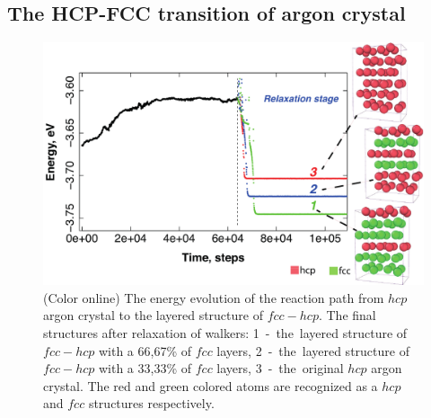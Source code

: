 \documentclass[preprint,12pt]{elsarticle}
\newcounter{bla}
\begin{document}












\subsection{The HCP-FCC transition of argon crystal}

\begin{figure}[!t]
 \begin{center}
 \includegraphics[scale=0.7]{energy.pdf}
  \caption{(Color online) The energy evolution of the reaction path from $hcp$ argon crystal to the layered structure of $fcc-hcp$.
  The final structures after relaxation of walkers:  1~-~the~layered structure of $fcc-hcp$ with a 66,67\% of $fcc$ layers, 2~-~the~layered structure of $fcc-hcp$ with a 33,33\% of $fcc$ layers, 3~-~the~original $hcp$ argon crystal.
  The red and green colored atoms are recognized as a $hcp$ and $fcc$ structures respectively.}
  \label{fig:energy_argon}
 \end{center}
\end{figure}
\end{document}
